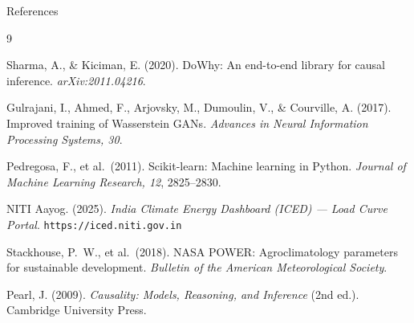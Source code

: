 \documentclass[aspectratio=169, 10pt]{beamer}
\begin{document}
\begin{frame}{References}

\small
\begin{thebibliography}{9}

Sharma, A., \& Kiciman, E. (2020).
DoWhy: An end-to-end library for causal inference.
\emph{arXiv:2011.04216}.

Gulrajani, I., Ahmed, F., Arjovsky, M., Dumoulin, V., \& Courville, A. (2017).
Improved training of Wasserstein GANs.
\emph{Advances in Neural Information Processing Systems, 30}.

Pedregosa, F., et al.\ (2011).
Scikit-learn: Machine learning in Python.
\emph{Journal of Machine Learning Research, 12}, 2825--2830.

NITI Aayog. (2025).
\emph{India Climate Energy Dashboard (ICED) — Load Curve Portal}.
\texttt{https://iced.niti.gov.in}

Stackhouse, P.\ W., et al.\ (2018).
NASA POWER: Agroclimatology parameters for sustainable development.
\emph{Bulletin of the American Meteorological Society}.

Pearl, J. (2009).
\emph{Causality: Models, Reasoning, and Inference} (2nd ed.).
Cambridge University Press.

\end{thebibliography}

\end{frame}

\end{document}
